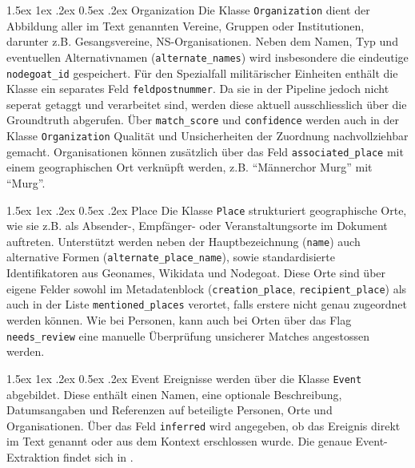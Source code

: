 \documentclass[12pt, a4paper, ngerman, bidi=default]{article}
\makeatletter
\newcommand{\code}[1]{\colorbox{VeryLightGray}{\texttt{#1}}} %
\let\oldparagraph\paragraph%
\renewcommand{\paragraph}{
    \@ifstar%
      \xxxParagraphStar%
      \xxxParagraphNoStar%
 }
\newcommand{\xxxParagraphStar}[1]{\oldparagraph*{#1}\mbox{}}
\newcommand{\xxxParagraphNoStar}[1]{\oldparagraph{#1}\mbox{}}
\renewcommand\paragraph{\@startsection{paragraph}{4}{0em}%
  {1.5ex \@plus1ex \@minus.2ex}%
  {0.5ex \@plus.2ex}%
  {\normalfont\normalsize\bfseries\itshape}}
\makeatother
\begin{document}
\paragraph{Organization}
Die Klasse \code{Organization} dient der Abbildung aller im Text genannten Vereine, Gruppen oder Institutionen, 
darunter z.B. Gesangsvereine, NS-Organisationen. Neben dem Namen, Typ und eventuellen 
Alternativnamen (\code{alternate\_names}) wird insbesondere die eindeutige \code{nodegoat\_id} gespeichert. Für den Spezialfall 
militärischer Einheiten enthält die Klasse ein separates Feld \code{feldpostnummer}. Da sie in der Pipeline jedoch nicht seperat getaggt und verarbeitet sind,
werden diese aktuell ausschliesslich über die Groundtruth abgerufen. Über \code{match\_score} und \code{confidence} 
werden auch in der Klasse \code{Organization} Qualität und Unsicherheiten der Zuordnung nachvollziehbar gemacht. 
Organisationen können zusätzlich über das Feld \code{associated\_place} mit einem geographischen Ort verknüpft werden, z.B. \enquote{Männerchor Murg} mit \enquote{Murg}.

\paragraph{Place}
Die Klasse \code{Place} strukturiert geographische Orte, wie sie z.B. als Absender-, Empfänger- oder 
Veranstaltungsorte im Dokument auftreten. Unterstützt werden neben der Hauptbezeichnung (\code{name}) 
auch alternative Formen (\code{alternate\_place\_name}), sowie standardisierte Identifikatoren aus Geonames, 
Wikidata und Nodegoat. Diese Orte sind über eigene Felder sowohl im Metadatenblock (\code{creation\_place}, 
\code{recipient\_place}) als auch in der Liste \code{mentioned\_places} verortet, falls erstere nicht genau zugeordnet werden können. 
Wie bei Personen, kann auch bei Orten 
über das Flag \code{needs\_review} eine manuelle Überprüfung unsicherer Matches angestossen werden.

\paragraph{Event}
Ereignisse werden über die Klasse \code{Event} abgebildet. Diese enthält einen Namen, eine optionale Beschreibung, 
Datumsangaben und Referenzen auf beteiligte Personen, Orte und Organisationen. Über das Feld \code{inferred} wird angegeben, 
ob das Ereignis direkt im Text genannt oder aus dem Kontext erschlossen wurde. Die genaue Event-Extraktion findet sich 
in .
\end{document}
